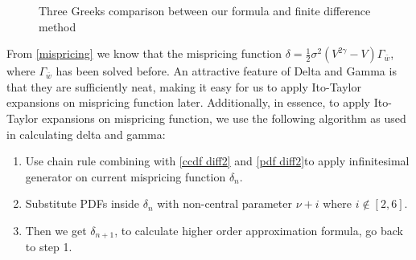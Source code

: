 \begin{figure}[ht]
    \hfill
    \caption{Three Greeks comparison between our formula and finite difference method}\label{greeks}
  \end{figure}

From \eqref{mispricing} we know that the mispricing function $\delta = \frac{1}{2} \sigma^2 (V^{2\gamma}-V) \Gamma_{\bar{w}}$, where $\Gamma_{\bar{w}}$ has been solved before. An attractive feature of Delta and Gamma is that they are sufficiently neat, making it easy for us to apply Ito-Taylor expansions on mispricing function later. Additionally, in essence, to apply Ito-Taylor expansions on mispricing function, we use the following algorithm as used in calculating delta and gamma:

\begin{enumerate}
    \item Use chain rule combining with \eqref{ccdf diff2} and \eqref{pdf diff2}to apply infinitesimal generator on current mispricing function $\delta_{n}$.
    \item Substitute PDFs inside $\delta_n$ with non-central parameter $\nu+i$ where $i \notin [2,6]$.
    \item Then we get $\delta_{n+1}$, to calculate higher order approximation formula, go back to step 1.
\end{enumerate}

